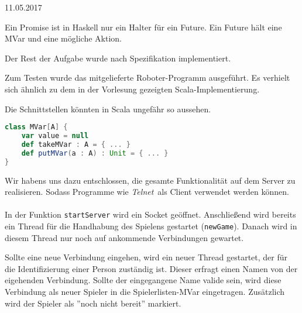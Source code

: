 \documentclass{rp}
\begin{document}


{11.05.2017} %

Ein Promise ist in Haskell nur ein Halter für ein Future. Ein Future hält eine MVar und eine mögliche Aktion.

Der Rest der Aufgabe wurde nach Spezifikation implementiert. 

Zum Testen wurde das mitgelieferte Roboter-Programm ausgeführt. Es verhielt sich ähnlich zu dem in der Vorlesung gezeigten Scala-Implementierung.

Die Schnittstellen könnten in Scala ungefähr so aussehen. 
\begin{lstlisting}[language=scala]
class MVar[A] {
    var value = null
    def takeMVar : A = { ... }
    def putMVar(a : A) : Unit = { ... }
}
\end{lstlisting}

Wir habens uns dazu entschlossen, die gesamte Funktionalität auf dem Server zu realisieren. Sodass Programme wie \textit{Telnet} als Client verwendet werden können.\\\\

In der Funktion \texttt{startServer} wird ein Socket geöffnet. Anschließend wird bereits ein Thread für die Handhabung des Spielens gestartet (\texttt{newGame}). Danach wird in diesem Thread nur noch auf ankommende Verbindungen gewartet. 

Sollte eine neue Verbindung eingehen, wird ein neuer Thread gestartet, der für die Identifizierung einer Person zuständig ist. Dieser erfragt einen Namen von der eigehenden Verbindung. Sollte der eingegangene Name valide sein, wird diese Verbindung als neuer Spieler in die Spielerlisten-MVar eingetragen. Zusätzlich wird der Spieler als ''noch nicht bereit'' markiert. 
\end{document}
